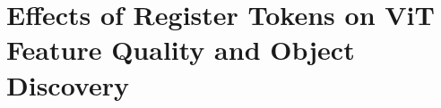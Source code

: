 \section{Effects of Register Tokens on ViT Feature Quality and Object Discovery}
\label{sec:exp3}






